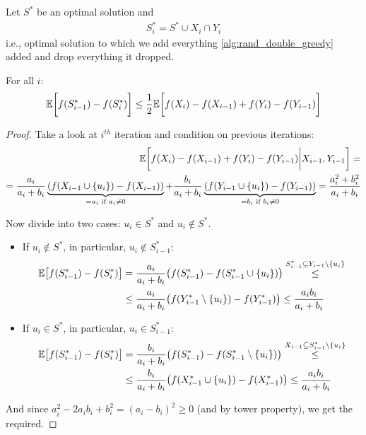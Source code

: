 \begin{lemma}
	Let $S^*$ be an optimal solution and 
	\begin{align}
	S^*_i = S^* \cup X_i \cap Y_i
	\end{align}
	i.e., optimal solution to which we add everything \cref{alg:rand_double_greedy} added and drop everything it dropped.
	
	For all $i$:
	\begin{align}
	\mathbb{E} \qty\bigg[f(S^*_{i-1}) - f(S^*_i)] \leq \frac{1}{2} \mathbb{E} \qty\bigg[f(X_i) - f(X_{i-1})+f(Y_i) - f(Y_{i-1}) ]
	\end{align}
	
	\begin{proof}
		Take a look at $i^{th}$ iteration and condition on previous iterations:
		\begin{align}
		\mathbb{E} \qty\bigg[ f(X_i) - f(X_{i-1}) + f(Y_i) - f(Y_{i-1}) \bigg\vert X_{i-1}, Y_{i-1}] =\\= \frac{a_i}{a_i+b_i} \underbrace{\qty(f(X_{i-1} \cup \qty{u_i})-f(X_{i-1}))}_{=a_i  \text{ if } a_i\neq 0} + \frac{b_i}{a_i+b_i} \underbrace{\qty(f(Y_{i-1} \cup \qty{u_i})-f(Y_{i-1}))}_{=b_i  \text{ if } b_i\neq 0} = \frac{a_i^2+b_i^2}{a_i+b_i}
		\end{align}
		
		Now divide into two cases: $u_i \in S^*$ and $u_i \notin S^*$.
		
		\begin{itemize}
			\item If $u_i \notin S^*$, in particular, $u_i \notin S^*_{i-1}$:
			\begin{align}
			\mathbb{E} \qty[f(S^*_{i-1})-f(S^*_{i}) ] &= \frac{a_i}{a_{i} + b_{i}} \qty(f(S^*_{i-1}) -f(S^*_{i-1}\cup \qty{u_i})) \stackrel{S^*_{i-1} \subseteq Y_{i-1}\setminus \qty{u_i}}{\leq }\\&\leq \frac{a_i}{a_{i} + b_{i}} \qty(f(Y^*_{i-1}\setminus \qty{u_i}) -f(Y^*_{i-1})) \leq \frac{a_i b_i}{a_i+b_i}
			\end{align}
			\item If $u_i \in S^*$, in particular, $u_i \in S^*_{i-1}$:
			\begin{align}
			\mathbb{E} \qty[f(S^*_{i-1})-f(S^*_{i}) ] &= \frac{b_i}{a_{i} + b_{i}} \qty(f(S^*_{i-1}) -f(S^*_{i-1}\setminus \qty{u_i})) \stackrel{X_{i-1} \subseteq S^*_{i-1} \setminus \qty{u_i}}{\leq }\\&\leq \frac{b_i}{a_{i} + b_{i}} \qty(f(X^*_{i-1}\cup \qty{u_i}) -f(X^*_{i-1})) \leq \frac{a_i b_i}{a_i+b_i}
			\end{align}
		\end{itemize}
		And since $a_i^2-2a_ib_i+b_i^2 = (a_i-b_i)^2 \geq 0$ (and by tower property), we get the required.
		
	\end{proof}
\end{lemma}


